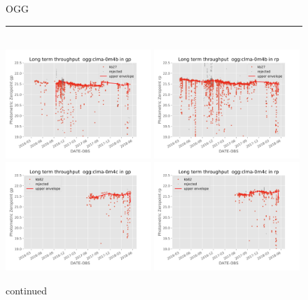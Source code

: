 \documentclass[]{spieman}
\begin{document}
\begin{figure}
OGG  \\ 
\rule{\textwidth}{0.4pt} \\
\includegraphics[width=0.49\textwidth]{images/photzptrend-ogg-clma-0m4b-gp.png} \hspace*{\fill}
\includegraphics[width=0.49\textwidth]{images/photzptrend-ogg-clma-0m4b-rp.png} \\
\includegraphics[width=0.49\textwidth]{images/photzptrend-ogg-clma-0m4c-gp.png} \hspace*{\fill}
\includegraphics[width=0.49\textwidth]{images/photzptrend-ogg-clma-0m4c-rp.png} \\[1ex]
\caption {continued}
\end{figure}
\end{document}
